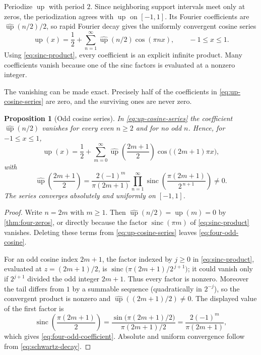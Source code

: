 \documentclass[11pt,oneside]{article}
\newtheorem{proposition}[theorem]{Proposition}
\theoremstyle{definition}
\theoremstyle{remark}
\newcommand{\Up}{\operatorname{up}}
\newcommand{\sinc}{\operatorname{sinc}}
\begin{document}
Periodize $\Up$ with period $2$.  Since neighboring support intervals meet only at zeros, the
periodization agrees with $\Up$ on $[-1,1]$.  Its Fourier coefficients are
$\widehat{\Up}(n/2)/2$, so rapid Fourier decay gives the uniformly convergent cosine series
\begin{equation}
 \Up(x)=\frac12+
 \sum_{n=1}^{\infty}\widehat{\Up}(n/2)\cos(\pi nx),
 \qquad -1\le x\le1.                                     \label{eq:up-cosine-series}
\end{equation}
Using \eqref{eq:sinc-product}, every coefficient is an explicit infinite product.  Many
coefficients vanish because one of the sinc factors is evaluated at a nonzero integer.


The vanishing can be made exact.  Precisely half of the coefficients in
\eqref{eq:up-cosine-series} are zero, and the surviving ones are never zero.

\begin{proposition}[Odd cosine series]
\label{prop:four-odd-cosine}
In \eqref{eq:up-cosine-series} the coefficient $\widehat{\Up}(n/2)$ vanishes for every even
$n\ge2$ and for no odd $n$.  Hence, for $-1\le x\le1$,
\begin{equation}
 \Up(x)=\frac12+\sum_{m=0}^{\infty}
 \widehat{\Up}\!\left(\frac{2m+1}{2}\right)\cos\bigl((2m+1)\pi x\bigr),
                                                          \label{eq:four-odd-cosine}
\end{equation}
with
\begin{equation}
 \widehat{\Up}\!\left(\frac{2m+1}{2}\right)
 =\frac{2(-1)^m}{\pi(2m+1)}
 \prod_{n=1}^{\infty}\sinc\!\left(\frac{\pi(2m+1)}{2^{\,n+1}}\right)\ne0 .
                                                          \label{eq:four-odd-coefficient}
\end{equation}
The series converges absolutely and uniformly on $[-1,1]$.
\end{proposition}

\begin{proof}
Write $n=2m$ with $m\ge1$.  Then $\widehat{\Up}(n/2)=\widehat{\Up}(m)=0$ by
\cref{thm:four-zeros}, or directly because the factor $\sinc(\pi m)$ of
\eqref{eq:sinc-product} vanishes.  Deleting these terms from \eqref{eq:up-cosine-series}
leaves \eqref{eq:four-odd-cosine}.

For an odd cosine index $2m+1$, the factor indexed by $j\ge0$ in
\eqref{eq:sinc-product}, evaluated at $z=(2m+1)/2$, is
$\sinc\bigl(\pi(2m+1)/2^{\,j+1}\bigr)$; it could vanish only if $2^{j+1}$ divided the odd
integer $2m+1$.  Thus every factor is nonzero.  Moreover the tail differs from $1$ by a
summable sequence (quadratically in $2^{-j}$), so the convergent product is nonzero and
$\widehat{\Up}((2m+1)/2)\ne0$.  The displayed value of the first factor is
\begin{equation*}
 \sinc\!\left(\frac{\pi(2m+1)}{2}\right)
 =\frac{\sin\bigl(\pi(2m+1)/2\bigr)}{\pi(2m+1)/2}
 =\frac{2(-1)^m}{\pi(2m+1)},
\end{equation*}
which gives \eqref{eq:four-odd-coefficient}.  Absolute and uniform convergence follow from
\eqref{eq:schwartz-decay}.
\end{proof}
\end{document}
